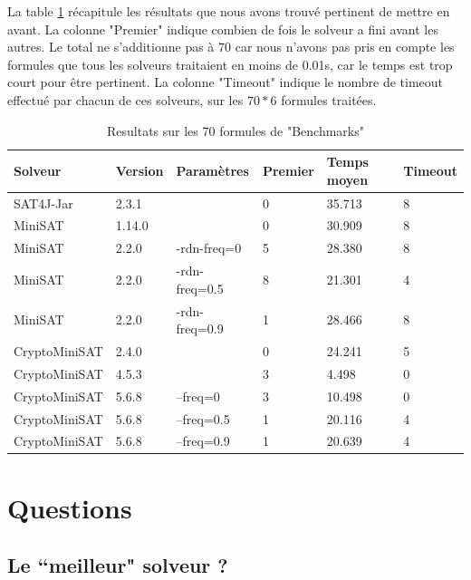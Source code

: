 \documentclass[11pt,a4paper]{article}
\begin{document}
La table \ref{tab:results} récapitule les résultats que nous avons trouvé pertinent de mettre en avant. 
La colonne "Premier" indique combien de fois le solveur a fini avant les autres. Le total ne s'additionne pas à 70 car nous n'avons pas pris en compte les formules que tous les solveurs traitaient en moins de 0.01s, car le temps est trop court pour être pertinent.
La colonne "Timeout" indique le nombre de timeout effectué par chacun de ces solveurs, sur les $70 * 6$ formules traitées. 

\begin{table}[]
\begin{tabular}{|l|l|l|l|l|l|}
\hline
Solveur       & Version & Paramètres    & Premier & Temps moyen        & Timeout \\ \hline
SAT4J-Jar     & 2.3.1   &               & 0       & 35.713  & 8       \\
MiniSAT       & 1.14.0  &               & 0       & 30.909  & 8       \\
MiniSAT       & 2.2.0   & -rdn-freq=0   & 5       & 28.380 & 8       \\
MiniSAT       & 2.2.0   & -rdn-freq=0.5 & 8       & 21.301 & 4       \\
MiniSAT       & 2.2.0   & -rdn-freq=0.9 & 1       & 28.466 & 8       \\
CryptoMiniSAT & 2.4.0   &               & 0       & 24.241 & 5       \\
CryptoMiniSAT & 4.5.3   &               & 3       & 4.498  & 0       \\
CryptoMiniSAT & 5.6.8   & --freq=0      & 3       & 10.498 & 0       \\
CryptoMiniSAT & 5.6.8   & --freq=0.5    & 1       & 20.116 & 4       \\
CryptoMiniSAT & 5.6.8   & --freq=0.9    & 1       & 20.639 & 4       \\ \hline
\end{tabular}
\caption{Resultats sur les 70 formules de "Benchmarks"}
\label{tab:results}
\end{table}


\section{Questions}

\subsection{Le ``meilleur" solveur ?}
\end{document}
